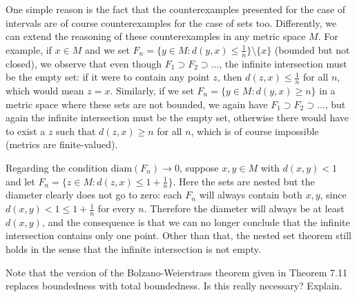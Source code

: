 \begin{solution}
    
    One simple reason is the fact that the counterexamples presented for the case of intervals are of course counterexamples for the case of sets too.
    Differently, we can extend the reasoning of these counterexamples in any metric space $M$.
    For example, if $x \in M$ and we set $F_n = \{y \in M: d(y, x) \leq \frac{1}{n}\} \setminus \{x\}$ (bounded but not closed), we observe that even though $F_1 \supset F_2 \supset \ldots$, the infinite intersection must be the empty set: if it were to contain any point $z$, then $d(z, x) \leq \frac{1}{n}$ for all $n$, which would mean $z = x$.
    Similarly, if we set $F_n = \{y \in M: d(y, x) \geq n\}$ in a metric space where these sets are not bounded, we again have $F_1 \supset F_2 \supset \ldots$, but again the infinite intersection must be the empty set, otherwise there would have to exist a $z$ such that $d(z, x) \geq n$ for all $n$, which is of course impossible (metrics are finite-valued).

    Regarding the condition $\text{diam}(F_n) \rightarrow 0$, suppose $x, y \in M$ with $d(x, y) < 1$ and let $F_n = \{z \in M: d(z, x) \leq 1 + \frac{1}{n}\}$.
    Here the sets are nested but the diameter clearly does not go to zero: each $F_n$ will always contain both $x, y$, since $d(x, y) < 1 \leq 1 + \frac{1}{n}$ for every $n$.
    Therefore the diameter will always be at least $d(x, y)$, and the consequence is that we can no longer conclude that the infinite intersection contains only one point.
    Other than that, the nested set theorem still holds in the sense that the infinite intersection is not empty.
\end{solution}

\begin{exercise}{27}
    Note that the version of the Bolzano-Weierstrass theorem given in Theorem 7.11 replaces boundedness with total boundedness.
    Is this really necessary?
    Explain.
\end{exercise}


